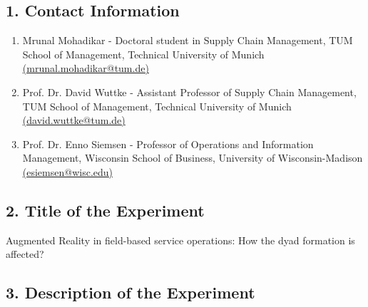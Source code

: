 \documentclass[A4,11pt]{article}
\begin{document}

\subsection*{1. Contact Information}
\begin{enumerate}
\item Mrunal Mohadikar - Doctoral student in Supply Chain Management, TUM School of Management, Technical University of Munich\\ \href{mailto:mrunal.mohadikar@tum.de}{(mrunal.mohadikar@tum.de)}
\item Prof. Dr. David Wuttke - Assistant Professor of Supply Chain Management, TUM School of Management, Technical University of Munich\\ \href{mailto:david.wuttke@tum.de}{(david.wuttke@tum.de)}
\item Prof. Dr. Enno Siemsen - Professor of Operations and Information Management, Wisconsin School of Business, University of Wisconsin-Madison\\ 
\href{mailto:esiemsen@wisc.edu}{(esiemsen@wisc.edu)}
\end{enumerate}

\subsection*{2. Title of the Experiment} 
Augmented Reality in field-based service operations: How the dyad formation is affected?

\subsection*{3. Description of the Experiment}
\end{document}
